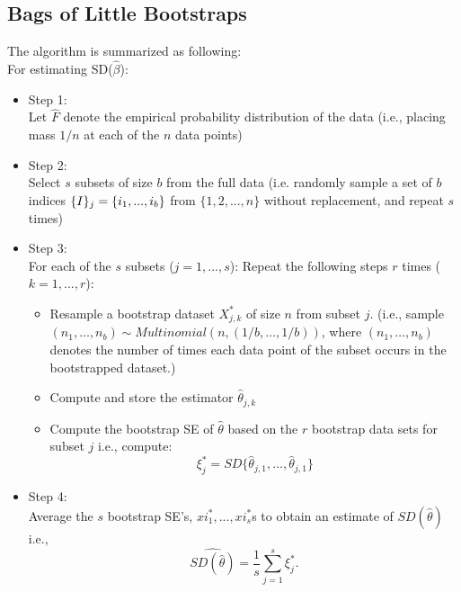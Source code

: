 \documentclass[article]{memoir}
\DeclareMathOperator{\1}{\mathbf{1}}
\theoremstyle{definition}
\begin{document}
\subsection{Bags of Little Bootstraps}
The algorithm is summarized as following:\\
For estimating SD($\widehat{\beta}$):\\
\begin{itemize}
\item Step 1:\\
Let $\widehat{F}$ denote the empirical probability distribution of the data (i.e., placing mass $1/n$ at each of the $n$ data points)
\item Step 2:\\
Select $s$ subsets of size $b$ from the full data (i.e. randomly sample a set of $b$ indices $\mathcal\{I\}_j=\{i_1,...,i_b\}$ from $\{1,2,...,n\}$ without replacement, and repeat $s$ times)
\item Step 3:\\
For each of the $s$ subsets ($j=1,...,s$):
Repeat the following steps $r$ times ($k=1,...,r$):
    \begin{itemize}
    \item Resample a bootstrap dataset $X_{j,k}^*$ of size $n$ from subset $j$. (i.e., sample $(n_1,…,n_b)\sim Multinomial(n,(1/b,…,1/b))$, where $(n_1,…,n_b)$ denotes the number of times each data point of the subset occurs in the bootstrapped dataset.)
    \item Compute and store the estimator $\widehat{\theta}_{j,k}$
    \item Compute the bootstrap SE of $\widehat{\theta}$ based on the $r$ bootstrap data sets for subset $j$ i.e., compute: $$\xi_j^*=SD\{\widehat{\theta}_{j,1},...,\widehat{\theta}_{j,1}\}$$
    \end{itemize}
\item Step 4:\\
Average the $s$ bootstrap SE's, $xi_1^*,...,xi_s^*$s to obtain an estimate of $SD(\widehat{\theta})$ i.e.,
$$\widehat{SD(\widehat{\theta})}=\frac{1}{s} \sum_{j=1}^s \xi_j^*.$$
\end{itemize}
\end{document}
